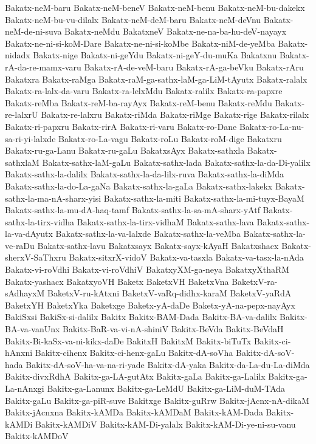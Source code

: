 {Bakatx-neM-baru
Bakatx-neM-beneV
Bakatx-neM-benu
Bakatx-neM-bu-dakekx
Bakatx-neM-bu-vu-dilalx
Bakatx-neM-deM-baru
Bakatx-neM-deVnu
Bakatx-neM-de-ni-suva
Bakatx-neMdu
BakatxneV
Bakatx-ne-na-ba-hu-deV-nayayx
Bakatx-ne-ni-si-koM-Dare
Bakatx-ne-ni-si-koMbe
Bakatx-niM-de-yeMba
Bakatx-nidadx
Bakatx-nige
Bakatx-ni-geYdu
Bakatx-ni-geY-du-muKa
Bakatxnu
Bakatx-rA-da-re-mamx-varu
Bakatx-rA-de-veM-baru
Bakatx-rA-ga-beVku
Bakatx-rAru
Bakatxra
Bakatx-raMga
Bakatx-raM-ga-sathx-laM-ga-LiM-tAyutx
Bakatx-ralalx
Bakatx-ra-lalx-da-varu
Bakatx-ra-lelxMdu
Bakatx-ralilx
Bakatx-ra-papxre
Bakatx-reMba
Bakatx-reM-ba-rayAyx
Bakatx-reM-benu
Bakatx-reMdu
Bakatx-re-lalxrU
Bakatx-re-lalxru
Bakatx-riMda
Bakatx-riMge
Bakatx-rige
Bakatx-rilalx
Bakatx-ri-papxru
Bakatx-rirA
Bakatx-ri-varu
Bakatx-ro-Dane
Bakatx-ro-La-nu-sa-ri-yi-lalxde
Bakatx-ro-La-vagu
Bakatx-roLu
Bakatx-roM-dige
Bakatxru
Bakatx-ru-ga-Lanu
Bakatx-ru-gaLu
BakatxsAyx
Bakatx-sathxla
Bakatx-sathxlaM
Bakatx-sathx-laM-gaLu
Bakatx-sathx-lada
Bakatx-sathx-la-da-Di-yalilx
Bakatx-sathx-la-dalilx
Bakatx-sathx-la-da-lilx-ruva
Bakatx-sathx-la-diMda
Bakatx-sathx-la-do-La-gaNa
Bakatx-sathx-la-gaLa
Bakatx-sathx-lakekx
Bakatx-sathx-la-ma-nA-sharx-yisi
Bakatx-sathx-la-miti
Bakatx-sathx-la-mi-tuyx-BayaM
Bakatx-sathx-la-mu-dA-haq-tamf
Bakatx-sathx-la-sa-mA-sharx-yAtf
Bakatx-sathx-la-tirx-vidha
Bakatx-sathx-la-tirx-vidhaM
Bakatx-sathx-lava
Bakatx-sathx-la-va-dAyutx
Bakatx-sathx-la-va-lalxde
Bakatx-sathx-la-veMba
Bakatx-sathx-la-ve-raDu
Bakatx-sathx-lavu
Bakatxsayx
Bakatx-sayx-kAyaH
Bakatxshacx
Bakatx-sherxV-SaThxru
Bakatx-sitxrX-vidoV
Bakatx-va-tasxla
Bakatx-va-tasx-la-nAda
Bakatx-vi-roVdhi
Bakatx-vi-roVdhiV
BakatxyXM-ga-neya
BakatxyXthaRM
Bakatx-yashacx
BakatxyoVH
Baketx
BaketxVH
BaketxVna
BaketxV-ra-sAdhayxM
BaketxV-ru-kAtxni
BaketxV-vaRq-didhx-karaM
BaketxV-yaRdA
BaketxYH
BaketxYka
Baketxge
Baketx-yA-daDe
Baketx-yA-na-pepx-nayAyx
BakiSxsi
BakiSx-si-dalilx
Bakitx
Bakitx-BAM-Dada
Bakitx-BA-va-dalilx
Bakitx-BA-va-vanUnx
Bakitx-BaR-va-vi-nA-shiniV
Bakitx-BeVda
Bakitx-BeVdaH
Bakitx-Bi-kaSx-va-ni-kikx-daDe
BakitxH
BakitxM
Bakitx-biTuTx
Bakitx-ci-hAnxni
Bakitx-cihenx
Bakitx-ci-henx-gaLu
Bakitx-dA-soVha
Bakitx-dA-soV-hada
Bakitx-dA-soV-ha-va-na-ri-yade
Bakitx-dA-yaka
Bakitx-da-La-du-La-diMda
Bakitx-divxRdhA
Bakitx-ga-LA-gutAtx
Bakitx-gaLa
Bakitx-ga-Lalilx
Bakitx-ga-La-nAnxgi
Bakitx-ga-Lanunx
Bakitx-ga-LeMdU
Bakitx-ga-LiM-duM-TAda
Bakitx-gaLu
Bakitx-ga-piR-suve
Bakitxge
Bakitx-guRrw
Bakitx-jAcnx-nA-dikaM
Bakitx-jAcnxna
Bakitx-kAMDa
Bakitx-kAMDaM
Bakitx-kAM-Dada
Bakitx-kAMDi
Bakitx-kAMDiV
Bakitx-kAM-Di-yalalx
Bakitx-kAM-Di-ye-ni-su-vanu
Bakitx-kAMDoV
}
